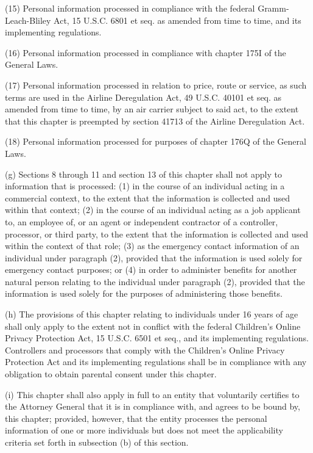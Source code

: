 (15) Personal information processed in compliance with the federal Gramm-Leach-Bliley Act, 15 U.S.C. 6801 et seq. as amended from time to time, and its implementing regulations. 

(16) Personal information processed in compliance with chapter 175I of the General Laws.  

(17) Personal information processed in relation to price, route or service, as such terms are used in the Airline Deregulation Act, 49 U.S.C. 40101 et seq. as amended from time to time, by an air carrier subject to said act, to the extent that this chapter is preempted by section 41713 of the Airline Deregulation Act.

(18) Personal information processed for purposes of chapter 176Q of the General Laws.

(g) Sections 8 through 11 and section 13 of this chapter shall not apply to information that is processed: (1) in the course of an individual acting in a commercial context, to the extent that the information is collected and used within that context; (2) in the course of an individual acting as a job applicant to, an employee of, or an agent or independent contractor of a controller, processor, or third party, to the extent that the information is collected and used within the context of that role; (3) as the emergency contact information of an individual under paragraph (2), provided that the information is used solely for emergency contact purposes; or (4) in order to administer benefits for another natural person relating to the individual under paragraph (2), provided that the information is used solely for the purposes of administering those benefits.

(h) The provisions of this chapter relating to individuals under 16 years of age shall only apply to the extent not in conflict with the federal Children's Online Privacy Protection Act, 15 U.S.C. 6501 et seq., and its implementing regulations. Controllers and processors that comply with the Children's Online Privacy Protection Act and its implementing regulations shall be in compliance with any obligation to obtain parental consent under this chapter.

(i) This chapter shall also apply in full to an entity that voluntarily certifies to the Attorney General that it is in compliance with, and agrees to be bound by, this chapter; provided, however, that the entity processes the personal information of one or more individuals but does not meet the applicability criteria set forth in subsection (b) of this section.


